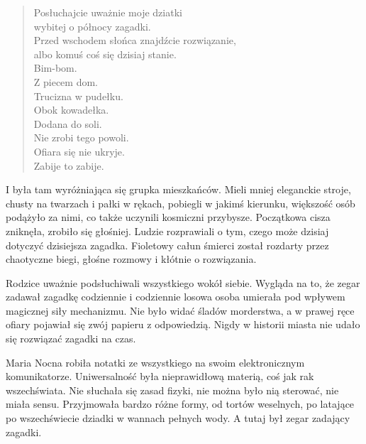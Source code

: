 \begin{sl}
\begin{quote}
Posłuchajcie uważnie moje dziatki \\
wybitej o północy zagadki. \\
Przed wschodem słońca znajdźcie rozwiązanie, \\
albo komuś coś się dzisiaj stanie. \\
Bim-bom. \\
Z piecem dom. \\
Trucizna w pudełku. \\
Obok kowadełka. \\
Dodana do soli. \\
Nie zrobi tego powoli. \\
Ofiara się nie ukryje. \\
Zabije to zabije. \\
\end{quote}
\end{sl}


I była tam wyróżniająca się grupka mieszkańców.
Mieli mniej eleganckie stroje, chusty na twarzach i pałki w rękach, pobiegli w jakimś kierunku, większość osób podążyło za nimi, co także uczynili kosmiczni przybysze.
Początkowa cisza zniknęła, zrobiło się głośniej.
Ludzie rozprawiali o tym, czego może dzisiaj dotyczyć dzisiejsza zagadka.
Fioletowy całun śmierci został rozdarty przez chaotyczne biegi, głośne rozmowy i kłótnie o rozwiązania.

Rodzice uważnie podsłuchiwali wszystkiego wokół siebie.
Wygląda na to, że zegar zadawał zagadkę codziennie i codziennie losowa osoba umierała pod wpływem magicznej siły mechanizmu.
Nie było widać śladów morderstwa, a w prawej ręce ofiary pojawiał się zwój papieru z odpowiedzią.
Nigdy w historii miasta nie udało się rozwiązać zagadki na czas.

Maria Nocna robiła notatki ze wszystkiego na swoim elektronicznym komunikatorze.
Uniwersalność była nieprawidłową materią, coś jak rak wszechświata.
Nie słuchała się zasad fizyki, nie można było nią sterować, nie miała sensu.
Przyjmowała bardzo różne formy, od tortów weselnych, po latające po wszechświecie dziadki w wannach pełnych wody.
A tutaj był zegar zadający zagadki.

